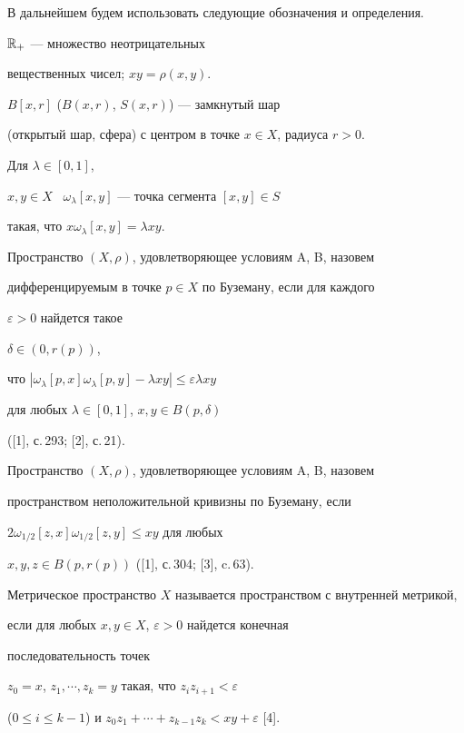 В дальнейшем будем использовать следующие обозначения и определения.


${\Bbb R}_{+}$ --- множество неотрицательных


вещественных чисел; $xy=\rho(x,y)$.


$B[x,r]$ ($B(x,r)$, $S(x,r)$) --- замкнутый шар


(открытый шар, сфера) с центром в точке $x \in X$, радиуса $r >0$.


Для $\lambda \in [0,1]$,


$x, y \in X$ \ $\omega_{\lambda}[x,y]$ --- точка сегмента $[x,y] \in S$


такая, что $x\omega_{\lambda}[x,y]=\lambda xy$.





Пространство $(X,\rho)$, удовлетворяющее условиям A, B, назовем


дифференцируемым в точке $p \in X$ по Буземану, если для каждого


$\varepsilon>0$ найдется такое


$\delta \in (0, r(p))$,


что $|\omega_{\lambda}[p, x]\omega_{\lambda}[p,y]-\lambda xy|\leq


\varepsilon \lambda xy$ 


для любых $\lambda \in [0, 1]$, $x, y \in B(p,\delta)$


([1], с.\,293; [2], с.\,21).





Пространство $(X,\rho)$, удовлетворяющее условиям A, B, назовем


пространством неположительной кривизны по Буземану, если


$2\omega_{1/2}[z,x]\omega_{1/2}[z,y] \leq xy$ для любых


$x, y, z \in B(p, r(p))$ ([1], с.\,304; [3], c.\,63).





Метрическое пространство $X$ называется пространством с внутренней метрикой,


если для любых $x,y\in X$, $\varepsilon>0$ найдется конечная 


последовательность точек


$z_{0}=x$, $z_{1},\dotsb, z_{k}=y$ такая, что $z_{i}z_{i+1}<\varepsilon$


($0 \leq i \leq k-1$) и $z_{0}z_{1}+\dotsb+z_{k-1}z_{k}<xy+\varepsilon$ [4].





